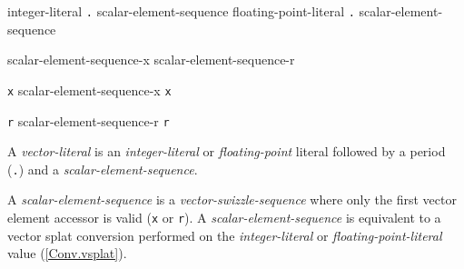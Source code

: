 

\begin{grammar}
  \br
  integer-literal \texttt{.} scalar-element-sequence\br
  floating-point-literal \texttt{.} scalar-element-sequence

  \br
  scalar-element-sequence-x\br
  scalar-element-sequence-r

  \br
  \texttt{x}\br
  scalar-element-sequence-x \texttt{x}

  \br
  \texttt{r}\br
  scalar-element-sequence-r \texttt{r}
\end{grammar}

\p A \textit{vector-literal} is an \textit{integer-literal} or
\textit{floating-point} literal followed by a period (\texttt{.}) and a
\textit{scalar-element-sequence}.

\p A \textit{scalar-element-sequence} is a \textit{vector-swizzle-sequence}
where only the first vector element accessor is valid (\texttt{x} or
\texttt{r}). A \textit{scalar-element-sequence} is equivalent to a vector splat
conversion performed on the \textit{integer-literal} or
\textit{floating-point-literal} value (\ref{Conv.vsplat}).
